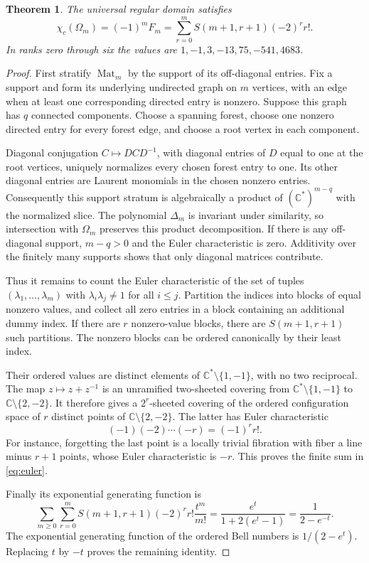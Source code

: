\documentclass[11pt]{article}
\newtheorem{theorem}{Theorem}[section]
\theoremstyle{remark}\newtheorem{remark}[theorem]{Remark}
\DeclareMathOperator{\Mat}{Mat}
\newcommand{\CC}{\mathbb C}
\begin{document}
\begin{theorem}\label{thm:euler}
The universal regular domain satisfies
\begin{equation}\label{eq:euler}
\boxed{\chi_c(\Omega_m)=(-1)^mF_m
=\sum_{r=0}^m S(m+1,r+1)(-2)^r r!.}
\end{equation}
In ranks zero through six the values are $1,-1,3,-13,75,-541,4683$.
\end{theorem}
\begin{proof}
First stratify $\Mat_m$ by the support of its off-diagonal entries. Fix a support and form its underlying undirected graph on $m$ vertices, with an edge when at least one corresponding directed entry is nonzero. Suppose this graph has $q$ connected components. Choose a spanning forest, choose one nonzero directed entry for every forest edge, and choose a root vertex in each component.

Diagonal conjugation $C\mapsto DCD^{-1}$, with diagonal entries of $D$ equal to one at the root vertices, uniquely normalizes every chosen forest entry to one. Its other diagonal entries are Laurent monomials in the chosen nonzero entries. Consequently this support stratum is algebraically a product of $(\CC^*)^{m-q}$ with the normalized slice. The polynomial $\Delta_m$ is invariant under similarity, so intersection with $\Omega_m$ preserves this product decomposition. If there is any off-diagonal support, $m-q>0$ and the Euler characteristic is zero. Additivity over the finitely many supports shows that only diagonal matrices contribute.

Thus it remains to count the Euler characteristic of the set of tuples $(\lambda_1,\dots,\lambda_m)$ with $\lambda_i\lambda_j\ne1$ for all $i\le j$. Partition the indices into blocks of equal nonzero values, and collect all zero entries in a block containing an additional dummy index. If there are $r$ nonzero-value blocks, there are $S(m+1,r+1)$ such partitions. The nonzero blocks can be ordered canonically by their least index.

Their ordered values are distinct elements of $\CC^*\setminus\{1,-1\}$, with no two reciprocal. The map $z\mapsto z+z^{-1}$ is an unramified two-sheeted covering from $\CC^*\setminus\{1,-1\}$ to $\CC\setminus\{2,-2\}$. It therefore gives a $2^r$-sheeted covering of the ordered configuration space of $r$ distinct points of $\CC\setminus\{2,-2\}$. The latter has Euler characteristic
\[
(-1)(-2)\cdots(-r)=(-1)^r r!.
\]
For instance, forgetting the last point is a locally trivial fibration with fiber a line minus $r+1$ points, whose Euler characteristic is $-r$. This proves the finite sum in \eqref{eq:euler}.

Finally its exponential generating function is
\[
\sum_{m\ge0}\sum_{r=0}^m S(m+1,r+1)(-2)^r r!\frac{t^m}{m!}
=\frac{e^t}{1+2(e^t-1)}=\frac1{2-e^{-t}}.
\]
The exponential generating function of the ordered Bell numbers is $1/(2-e^t)$. Replacing $t$ by $-t$ proves the remaining identity.
\end{proof}
\end{document}

